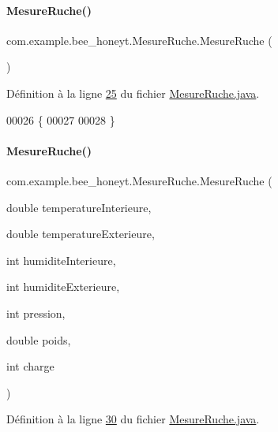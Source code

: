 \paragraph{\texorpdfstring{Mesure\+Ruche()}{MesureRuche()}\hspace{0.1cm}{\footnotesize\ttfamily [1/3]}}
{\footnotesize\ttfamily com.\+example.\+bee\+\_\+honeyt.\+Mesure\+Ruche.\+Mesure\+Ruche (\begin{DoxyParamCaption}{ }\end{DoxyParamCaption})}



Définition à la ligne \hyperlink{_mesure_ruche_8java_source_l00025}{25} du fichier \hyperlink{_mesure_ruche_8java_source}{Mesure\+Ruche.\+java}.


\begin{DoxyCode}
00026     \{
00027 
00028     \}
\end{DoxyCode}
\mbox{\label{classcom_1_1example_1_1bee__honeyt_1_1_mesure_ruche_ab9e1fdc4825a5fda8172e6973ce7ec31}} 
\paragraph{\texorpdfstring{Mesure\+Ruche()}{MesureRuche()}\hspace{0.1cm}{\footnotesize\ttfamily [2/3]}}
{\footnotesize\ttfamily com.\+example.\+bee\+\_\+honeyt.\+Mesure\+Ruche.\+Mesure\+Ruche (\begin{DoxyParamCaption}\item[{double}]{temperature\+Interieure,  }\item[{double}]{temperature\+Exterieure,  }\item[{int}]{humidite\+Interieure,  }\item[{int}]{humidite\+Exterieure,  }\item[{int}]{pression,  }\item[{double}]{poids,  }\item[{int}]{charge }\end{DoxyParamCaption})}



Définition à la ligne \hyperlink{_mesure_ruche_8java_source_l00030}{30} du fichier \hyperlink{_mesure_ruche_8java_source}{Mesure\+Ruche.\+java}.



